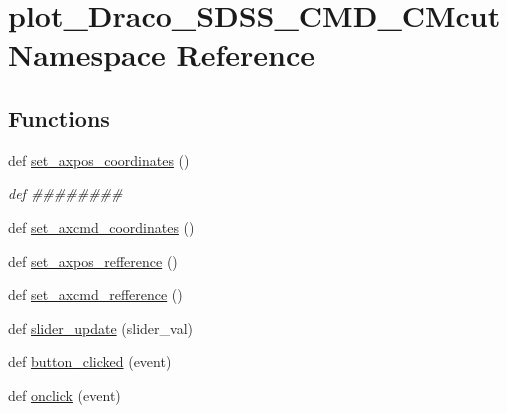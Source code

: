 \hypertarget{namespaceplot__Draco__SDSS__CMD__CMcut}{}\section{plot\+\_\+\+Draco\+\_\+\+S\+D\+S\+S\+\_\+\+C\+M\+D\+\_\+\+C\+Mcut Namespace Reference}
\label{namespaceplot__Draco__SDSS__CMD__CMcut}
\subsection*{Functions}
\begin{DoxyCompactItemize}
\item 
def \hyperlink{namespaceplot__Draco__SDSS__CMD__CMcut_ad99fb273d1ebc75e7b04b98c0a816850}{set\+\_\+axpos\+\_\+coordinates} ()
\begin{DoxyCompactList}\small\item\em def \#\#\#\#\#\#\#\# \end{DoxyCompactList}\item 
def \hyperlink{namespaceplot__Draco__SDSS__CMD__CMcut_a60ce42012054eda79f3b4e90220dabf4}{set\+\_\+axcmd\+\_\+coordinates} ()
\item 
def \hyperlink{namespaceplot__Draco__SDSS__CMD__CMcut_acfc5ebd089fe79d0c0687af77f2fdeb4}{set\+\_\+axpos\+\_\+refference} ()
\item 
def \hyperlink{namespaceplot__Draco__SDSS__CMD__CMcut_aae145b9b27b43700b61a9a20532367a3}{set\+\_\+axcmd\+\_\+refference} ()
\item 
def \hyperlink{namespaceplot__Draco__SDSS__CMD__CMcut_a9bc5b2b68855c01a286faea241fb5940}{slider\+\_\+update} (slider\+\_\+val)
\item 
def \hyperlink{namespaceplot__Draco__SDSS__CMD__CMcut_a476729e1148bad592cbcca8131d3d254}{button\+\_\+clicked} (event)
\item 
def \hyperlink{namespaceplot__Draco__SDSS__CMD__CMcut_accf5e8132b25421b87fac3fde5057644}{onclick} (event)
\end{DoxyCompactItemize}
